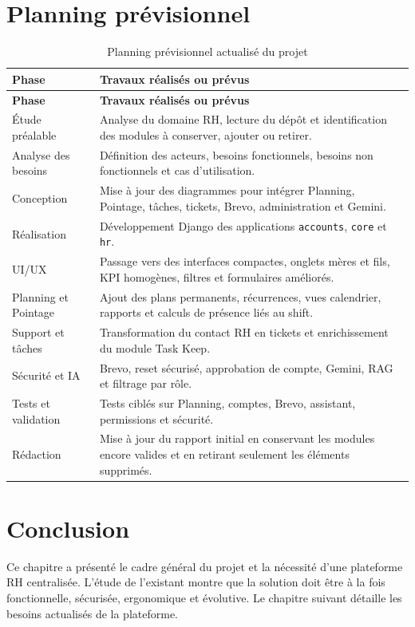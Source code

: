\documentclass[12pt,a4paper]{report}
\begin{document}
\section{Planning prévisionnel}
\begin{longtable}{p{4cm}p{10cm}}
\caption{Planning prévisionnel actualisé du projet}\label{tab:planning-previsionnel}\\
\toprule
\textbf{Phase} & \textbf{Travaux réalisés ou prévus}\\
\midrule
\endfirsthead
\toprule
\textbf{Phase} & \textbf{Travaux réalisés ou prévus}\\
\midrule
\endhead
Étude préalable & Analyse du domaine RH, lecture du dépôt et identification des modules à conserver, ajouter ou retirer.\\
Analyse des besoins & Définition des acteurs, besoins fonctionnels, besoins non fonctionnels et cas d'utilisation.\\
Conception & Mise à jour des diagrammes pour intégrer Planning, Pointage, tâches, tickets, Brevo, administration et Gemini.\\
Réalisation & Développement Django des applications \texttt{accounts}, \texttt{core} et \texttt{hr}.\\
UI/UX & Passage vers des interfaces compactes, onglets mères et fils, KPI homogènes, filtres et formulaires améliorés.\\
Planning et Pointage & Ajout des plans permanents, récurrences, vues calendrier, rapports et calculs de présence liés au shift.\\
Support et tâches & Transformation du contact RH en tickets et enrichissement du module Task Keep.\\
Sécurité et IA & Brevo, reset sécurisé, approbation de compte, Gemini, RAG et filtrage par rôle.\\
Tests et validation & Tests ciblés sur Planning, comptes, Brevo, assistant, permissions et sécurité.\\
Rédaction & Mise à jour du rapport initial en conservant les modules encore valides et en retirant seulement les éléments supprimés.\\
\bottomrule
\end{longtable}

\section{Conclusion}
Ce chapitre a présenté le cadre général du projet et la nécessité d'une plateforme RH centralisée. L'étude de l'existant montre que la solution doit être à la fois fonctionnelle, sécurisée, ergonomique et évolutive. Le chapitre suivant détaille les besoins actualisés de la plateforme.
\end{document}
